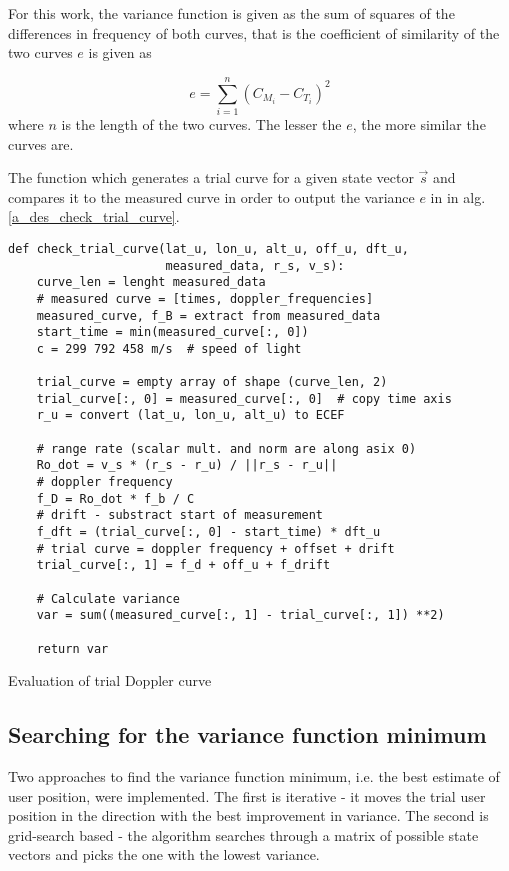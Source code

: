 For this work, the variance function is given as the sum of squares of the differences in frequency of both curves, that is the coefficient of similarity of the two curves $e$ is given as

\begin{equation}
    e = \sum_{i=1}^n (C_{M_i} - C_{T_i})^2
\end{equation}
where $n$ is the length of the two curves. The lesser the $e$, the more similar the curves are.

The function which generates a trial curve for a given state vector $\Vec{s}$ and compares it to the measured curve in order to output the variance $e$ in in alg. \ref{a_des_check_trial_curve}.

\begin{algorithm}
    \centering
    \begin{verbatim}
def check_trial_curve(lat_u, lon_u, alt_u, off_u, dft_u, 
                      measured_data, r_s, v_s):                      
    curve_len = lenght measured_data
    # measured curve = [times, doppler_frequencies]
    measured_curve, f_B = extract from measured_data
    start_time = min(measured_curve[:, 0])
    c = 299 792 458 m/s  # speed of light
    
    trial_curve = empty array of shape (curve_len, 2)
    trial_curve[:, 0] = measured_curve[:, 0]  # copy time axis
    r_u = convert (lat_u, lon_u, alt_u) to ECEF

    # range rate (scalar mult. and norm are along asix 0)
    Ro_dot = v_s * (r_s - r_u) / ||r_s - r_u|| 
    # doppler frequency 
    f_D = Ro_dot * f_b / C  
    # drift - substract start of measurement
    f_dft = (trial_curve[:, 0] - start_time) * dft_u
    # trial curve = doppler frequency + offset + drift
    trial_curve[:, 1] = f_d + off_u + f_drift

    # Calculate variance
    var = sum((measured_curve[:, 1] - trial_curve[:, 1]) **2)
    
    return var
    \end{verbatim}
    \caption{Evaluation of trial Doppler curve}
    \label{a_des_check_trial_curve}
\end{algorithm}


\subsection{Searching for the variance function minimum}
Two approaches to find the variance function minimum, i.e. the best estimate of user position, were implemented. The first is iterative - it moves the trial user position in the direction with the best improvement in variance. The second is grid-search based - the algorithm searches through a matrix of possible state vectors and picks the one with the lowest variance.

